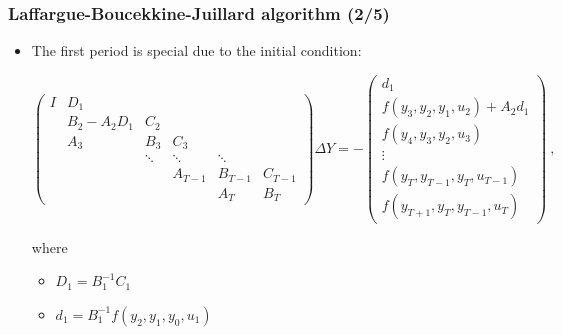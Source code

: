 \documentclass[handout,usepdftitle=false,xcolor=dvipsnames,aspectratio=169]{beamer}
\begin{document}
\begin{frame}
  \frametitle{Laffargue-Boucekkine-Juillard algorithm (2/5)}
  \begin{itemize}
    \item The first period is special due to the initial condition:
          \begin{small}
            \begin{equation}
              \begin{pmatrix}
                I & D_1        &        &         &         &         \\
                  & B_2-A_2D_1 & C_2    &         &         &         \\
                  & A_3        & B_3    & C_3     &         &         \\
                  &            & \ddots & \ddots  & \ddots  &         \\
                  &            &        & A_{T-1} & B_{T-1} & C_{T-1} \\
                  &            &        &         & A_T     & B_T
              \end{pmatrix}
              \Delta Y
              =
              -\begin{pmatrix}
                d_1                            \\
                f(y_3,y_2,y_1,u_2)+A_2 d_1     \\
                f(y_4,y_3,y_2,u_3)             \\
                \vdots                         \\
                f(y_{T},y_{T-1},y_{T},u_{T-1}) \\
                f(y_{T+1},y_T,y_{T-1},u_T)
              \end{pmatrix} \: ,
            \end{equation}
          \end{small}

          where

          \begin{itemize}
            \item $D_1 = B_1^{-1}C_1$
            \item $d_1 = B_1^{-1}f(y_2,y_1,y_0,u_1)$
          \end{itemize}
  \end{itemize}
\end{frame}
\end{document}
